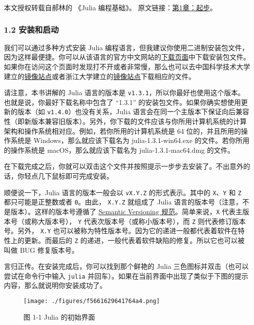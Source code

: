 
本文授权转载自郝林的 《Julia 编程基础》。 原文链接：\href{https://github.com/hyper0x/JuliaBasics/blob/master/book/ch01.md}{第1章：起步}。

\subsubsection{1.2 安装和启动}

我们可以通过多种方式安装 Julia 编程语言，但我建议你使用二进制安装包文件，因为这样最便捷。你可以从该语言的官方中文网站的\href{https://cn.julialang.org/downloads/}{下载页面}中下载安装包文件。如果你在访问这个页面时发现打不开或者非常慢，那么也可以去中国科学技术大学建立的\href{https://mirrors.zju.edu.cn/julia/releases/}{镜像站点}或者浙江大学建立的\href{https://mirrors.ustc.edu.cn/julia/releases/}{镜像站点}下载相应的文件。

请注意，本书讲解的 Julia 语言的版本是 \verb|v1.3.1|，所以你最好也使用这个版本。也就是说，你最好下载名称中包含了 “1.3.1” 的安装包文件。如果你确实想使用更新的版本（如 \verb|v1.4.0|）也没有关系，Julia 语言会在同一个主版本下保证向后兼容性（即新版本兼容旧版本）。另外，你下载的文件应该与你所用计算机系统的计算架构和操作系统相对应。例如，若你所用的计算机系统是 64 位的，并且所用的操作系统是 Windows，那么就应该下载名为 julia-1.3.1-win64.exe 的文件。若你所用的操作系统是 macOS，那么就应该下载名为 julia-1.3.1-mac64.dmg 的文件。

在下载完成之后，你就可以双击这个文件并按照提示一步步去安装了。不出意外的话，你轻点几下鼠标即可完成安装。

顺便说一下，Julia 语言的版本一般会以 \verb|vX.Y.Z| 的形式表示。其中的 \verb|X|、\verb|Y| 和 \verb|Z| 都只可能是正整数或者 \verb|0|。由此， \verb|X.Y.Z| 就组成了 Julia 语言的版本号（注意，不是版本）。这样的版本号遵循了 \href{https://semver.org}{Semantic Versioning 规范}。简单来说，\verb|X| 代表主版本号（或称大版本号）， \verb|Y| 代表次版本号（或称小版本号），而 \verb|Z| 则代表修订版本号。另外， \verb|X.Y| 也可以被称为特性版本号。因为它的递进一般都代表着软件在特性上的更新。而最后的 \verb|Z| 的递进，一般代表着软件缺陷的修复。所以它也可以被叫做 BUG 修复版本号。

言归正传。在安装完成后，你可以找到那个鲜艳的 Julia 三色图标并双击（也可以尝试在命令行中输入 \verb|julia| 并回车）。如果在当前界面中出现了类似于下图的提示内容，那么就说明你安装成功了。

\begin{figure}[ht]
\centering
\texttt{[image: ./figures/f5661629641764a4.png]}
\caption{图 1-1 Julia 的初始界面} \label{fig_JuC1S2_1}
\end{figure}

